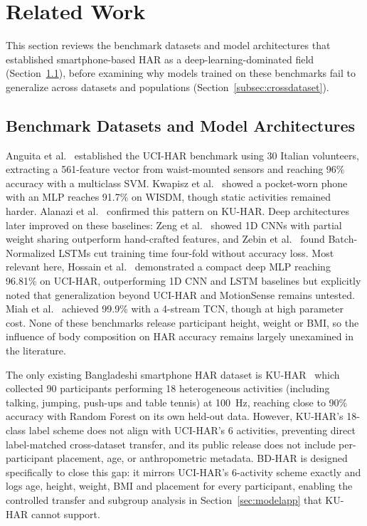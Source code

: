 \documentclass[conference]{IEEEtran}
\begin{document}
\section{Related Work}
\label{sec:background}

This section reviews the benchmark datasets and model architectures
that established smartphone-based HAR as a deep-learning-dominated
field (Section~\ref{subsec:datasets}), before examining why models
trained on these benchmarks fail to generalize across datasets and
populations (Section~\ref{subsec:crossdataset}).

\subsection{Benchmark Datasets and Model Architectures}
\label{subsec:datasets}
Anguita et al.~\cite{anguita_public_2013} established the UCI-HAR
benchmark using 30 Italian volunteers, extracting a 561-feature vector
from waist-mounted sensors and reaching 96\% accuracy with a multiclass
SVM. Kwapisz et al.~\cite{kwapisz_activity_2011} showed a pocket-worn
phone with an MLP reaches 91.7\% on WISDM, though static activities
remained harder. Alanazi et al.~\cite{alanazi_human_2024} confirmed
this pattern on KU-HAR. Deep architectures later improved on these
baselines: Zeng et al.~\cite{zeng_convolutional_2014} showed 1D CNNs with
partial weight sharing outperform hand-crafted features, and Zebin et
al.~\cite{zebin_human_2018} found Batch-Normalized LSTMs cut training
time four-fold without accuracy loss. Most relevant here, Hossain et
al.~\cite{hossain_enhanced_2024} demonstrated a compact deep MLP
reaching 96.81\% on UCI-HAR, outperforming 1D CNN and LSTM baselines but
explicitly noted that generalization beyond UCI-HAR and MotionSense
remains untested. Miah et al.~\cite{miah_sensor_based_2024} achieved 99.9\% with a 4-stream TCN, though at high parameter cost. None of these
benchmarks release participant height, weight or BMI, so the influence
of body composition on HAR accuracy remains largely unexamined in the
literature.

The only existing Bangladeshi smartphone HAR dataset is
KU-HAR~\cite{sikder_kuhar_2021} which collected 90 participants
performing 18 heterogeneous activities (including talking, jumping,
push-ups and table tennis) at 100~Hz, reaching close to 90\% accuracy
with Random Forest on its own held-out data. However, KU-HAR's
18-class label scheme does not align with UCI-HAR's 6 activities,
preventing direct label-matched cross-dataset transfer, and its public
release does not include per-participant placement, age, or
anthropometric metadata. BD-HAR is designed specifically to close this
gap: it mirrors UCI-HAR's 6-activity scheme exactly and logs age,
height, weight, BMI and placement for every participant, enabling the
controlled transfer and subgroup analysis in
Section~\ref{sec:modelapp} that KU-HAR cannot support.
\end{document}
